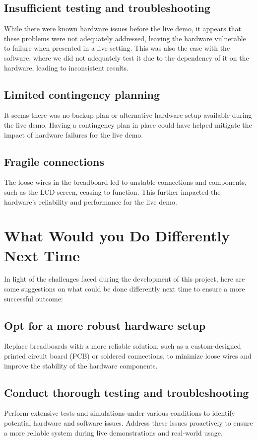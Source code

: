 \documentclass{article}
\begin{document}
\subsection{Insufficient testing and troubleshooting}
While there were known hardware issues before the live demo, it appears that these problems were not adequately addressed, leaving the hardware vulnerable to failure when presented in a live setting.
This was also the case with the software, where we did not adequately test it due to the dependency of it on the hardware, leading to inconsistent results.

\subsection{Limited contingency planning}
It seems there was no backup plan or alternative hardware setup available during the live demo. Having a contingency plan in place could have helped mitigate the impact of hardware failures for the live demo.

\subsection{Fragile connections}
The loose wires in the breadboard led to unstable connections and components, such as the LCD screen, ceasing to function. This further impacted the hardware's reliability and performance for the live demo.

\section{What Would you Do Differently Next Time}

In light of the challenges faced during the development of this project, here are some suggestions on what could be done differently next time to ensure a more successful outcome:

\subsection{Opt for a more robust hardware setup}
Replace breadboards with a more reliable solution, such as a custom-designed printed circuit board (PCB) or soldered connections, to minimize loose wires and improve the stability of the hardware components.

\subsection{Conduct thorough testing and troubleshooting}
Perform extensive tests and simulations under various conditions to identify potential hardware and software issues. Address these issues proactively to ensure a more reliable system during live demonstrations and real-world usage.
\end{document}
